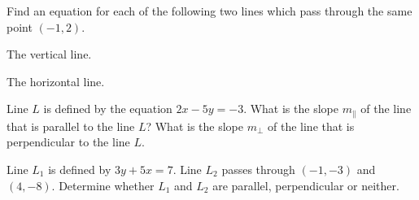 \newpage


\begin{exercise}
	Find an equation for each of the following two lines which pass through the same point $(-1, 2)$.\\
	\begin{enumerate*}[label={(\arabic*)~}]
	\item The vertical line.
	\item The horizontal line.\hfill\null
	\end{enumerate*}
\end{exercise}

\vfill

\hfill
\begin{center}
\end{center}

\begin{exercise} Line $L$ is defined by the equation $2x-5y=-3$.
	What is the slope $m_\parallel$ of the line that is parallel to the line $L$? 
	What is the slope $m_\perp$ of the line that is perpendicular to the line $L$.
\end{exercise}

\hfill
\begin{center}
\end{center}

\begin{exercise}
	Line $L_1$ is defined by $3y+5x=7$. Line $L_2$ passes through $(-1, -3)$ and $(4, -8)$. Determine whether $L_1$ and $L_2$ are parallel, perpendicular or neither.
\end{exercise}

\hfill
\begin{center}
\end{center}

